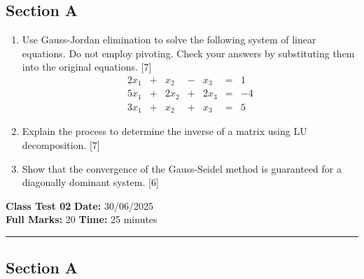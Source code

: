 \documentclass[12pt]{article}
\begin{document}
	\subsection*{Section A}
	
	\begin{enumerate}
		\item Use Gauss-Jordan elimination to solve the following system of linear equations. Do not employ pivoting. Check your answers by substituting them into the original equations. \hfill [7]
		\[
		\begin{array}{rcrcrcl}
			2x_1 & + & x_2 & - & x_3 & = & 1 \\
			5x_1 & + & 2x_2 & + & 2x_3 & = & -4 \\
			3x_1 & + & x_2 & + & x_3 & = & 5
		\end{array}
		\]
		
		\item Explain the process to determine the inverse of a matrix using LU decomposition. \hfill [7]
		
		\item Show that the convergence of the Gauss-Seidel method is guaranteed for a diagonally dominant system. \hfill [6]
		
	\end{enumerate}
	
	\newpage
	
	\thispagestyle{empty}
	\noindent\textbf{Class Test 02} \hfill \textbf{Date:} 30/06/2025 \\
	\textbf{Full Marks:} 20 \hfill \textbf{Time:} 25 minutes
	\vspace{4pt}
	\rule{\textwidth}{0.4pt}
	\subsection*{Section A}
	
\end{document}
